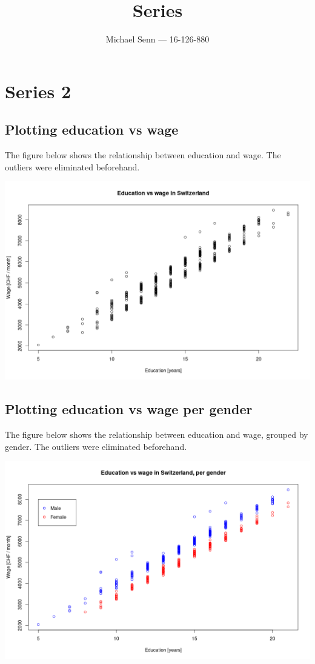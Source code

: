 \documentclass[a4paper]{scrreprt}
\title{Series \series}
\author{Michael Senn \maillink{michael.senn@students.unibe.ch} --- 16-126-880}
\date{\printdate}
\newcommand{\series}{2}
\begin{document}
\maketitle


\setcounter{chapter}{\numexpr \series - 1 \relax}

\chapter{Series \series}

\section{Plotting education vs wage}

The figure below shows the relationship between education and wage. The
outliers were eliminated beforehand.

\includegraphics[width=\textwidth]{resources/01_education_wage.png}

\section{Plotting education vs wage per gender}

The figure below shows the relationship between education and wage, grouped by
gender. The outliers were eliminated beforehand.

\includegraphics[width=\textwidth]{resources/02_education_wage_gender.png}
\end{document}
